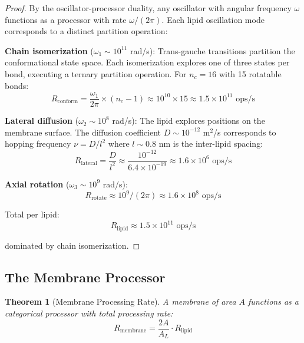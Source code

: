 \documentclass[twocolumn,10pt]{article}
\newtheorem{theorem}{Theorem}[section]
\theoremstyle{remark}
\begin{document}
\begin{proof}
By the oscillator-processor duality, any oscillator with angular frequency $\omega$ functions as a processor with rate $\omega/(2\pi)$. Each lipid oscillation mode corresponds to a distinct partition operation:

\textbf{Chain isomerization} ($\omega_1 \sim 10^{11}$ rad/s): Trans-gauche transitions partition the conformational state space. Each isomerization explores one of three states per bond, executing a ternary partition operation. For $n_c = 16$ with 15 rotatable bonds:
\begin{equation}
    R_{\text{conform}} = \frac{\omega_1}{2\pi} \times (n_c - 1) \approx 10^{10} \times 15 \approx 1.5 \times 10^{11} \text{ ops/s}
\end{equation}

\textbf{Lateral diffusion} ($\omega_2 \sim 10^{8}$ rad/s): The lipid explores positions on the membrane surface. The diffusion coefficient $D \sim 10^{-12}$ m$^2$/s corresponds to hopping frequency $\nu = D/l^2$ where $l \sim 0.8$ nm is the inter-lipid spacing:
\begin{equation}
    R_{\text{lateral}} = \frac{D}{l^2} \approx \frac{10^{-12}}{6.4 \times 10^{-19}} \approx 1.6 \times 10^{6} \text{ ops/s}
\end{equation}

\textbf{Axial rotation} ($\omega_3 \sim 10^{9}$ rad/s):
\begin{equation}
    R_{\text{rotate}} \approx 10^{9}/(2\pi) \approx 1.6 \times 10^{8} \text{ ops/s}
\end{equation}

Total per lipid:
\begin{equation}
    R_{\text{lipid}} \approx 1.5 \times 10^{11} \text{ ops/s}
\end{equation}

dominated by chain isomerization.
\end{proof}

\subsection{The Membrane Processor}

\begin{theorem}[Membrane Processing Rate]
\label{thm:membrane_processor}
A membrane of area $A$ functions as a categorical processor with total processing rate:
\begin{equation}
    R_{\text{membrane}} = \frac{2A}{A_L} \cdot R_{\text{lipid}}
\end{equation}
\end{theorem}
\end{document}
